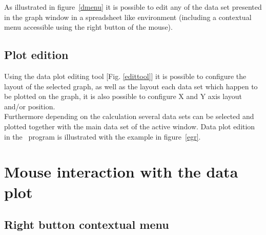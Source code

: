 As illustrated in figure~\ref{dmenu} it is possible to edit any of the data set presented in the graph window in a spreadsheet like environment (including a contextual menu accessible using the right button of the mouse). 
\dmenufig
\clearpage

\subsection{Plot edition}

Using the data plot editing tool [Fig. \ref{edittool}] it is possible to configure the layout of the selected graph, as well as the layout each data set which happen to be plotted on the graph, it is also possible to configure X and Y axis layout and/or position. \\
\clearpage
\noindent Furthermore depending on the calculation several data sets can be selected and plotted together with the main data set of the active window.
Data plot edition in the \atomes\ program is illustrated with the example in figure~\ref{egr}. \\
\egrfig

\clearpage

\section{Mouse interaction with the data plot}

\subsection{Right button contextual menu}

